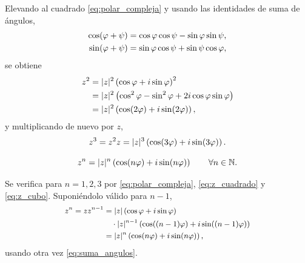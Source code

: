 Elevando al cuadrado \eqref{eq:polar_compleja} y usando las identidades de
suma de \'angulos,
\begin{equation}
  \label{eq:suma_angulos}
  \begin{aligned}
    \cos(\varphi+\psi)&=\cos\varphi\cos\psi-\sin\varphi\sin\psi,\\
    \sin(\varphi+\psi)&=\sin\varphi\cos\psi+\sin\psi\cos\varphi,
  \end{aligned}
\end{equation}
se obtiene
\begin{equation}
  \label{eq:z_cuadrado}
  \begin{aligned}
    z^2&=\lvert z \rvert^2\left( \cos\varphi+i\sin\varphi \right)^2\\
       &=\lvert z \rvert^2\left( \cos^2\varphi-\sin^2\varphi
          +2i\cos\varphi\sin\varphi \right)\\
       &=\lvert z \rvert^2\left( \cos(2\varphi)+i\sin(2\varphi) \right),
  \end{aligned}
\end{equation}
y multiplicando de nuevo por $z$,
\begin{equation}
  \label{eq:z_cubo}
  z^3=z^2z=\lvert z \rvert^3\left( \cos(3\varphi)+i\sin(3\varphi) \right) .
\end{equation}

\begin{teorema}[De Moivre]
  \label{teo:moivre}
  \begin{equation}
    \label{eq:moivre}
    z^n=\lvert z \rvert^n\left( \cos(n\varphi)+i\sin(n\varphi) \right)
    \qquad\forall n\in\mathbb{N} .
  \end{equation}
\end{teorema}

\begin{demostracion}
  Se verifica para $n=1,2,3$ por \eqref{eq:polar_compleja},
  \eqref{eq:z_cuadrado} y \eqref{eq:z_cubo}. Suponi\'endolo v\'alido para
  $n-1$,
  \begin{equation}
    \label{eq:induccion_moivre}
    \small
    \begin{aligned}
      z^n=zz^{n-1}
        &=\lvert z \rvert\left( \cos\varphi+i\sin\varphi \right)\\
        &\quad\cdot\lvert z \rvert^{n-1}
          \left( \cos((n-1)\varphi)+i\sin((n-1)\varphi) \right)\\
        &=\lvert z \rvert^n\left( \cos(n\varphi)+i\sin(n\varphi) \right),
    \end{aligned}
  \end{equation}
  usando otra vez \eqref{eq:suma_angulos}.
\end{demostracion}

